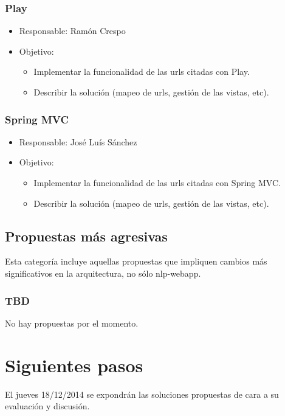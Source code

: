 \documentclass[11pt]{article}
\begin{document}
\subsubsection{Play}
\label{sec-3-2-1}
\begin{itemize}
\item Responsable: Ramón Crespo
\item Objetivo:
\begin{itemize}
\item Implementar la funcionalidad de las urls citadas con Play.
\item Describir la solución (mapeo de urls, gestión de las vistas, etc).
\end{itemize}
\end{itemize}
\subsubsection{Spring MVC}
\label{sec-3-2-2}
\begin{itemize}
\item Responsable: José Luís Sánchez
\item Objetivo:
\begin{itemize}
\item Implementar la funcionalidad de las urls citadas con Spring MVC.
\item Describir la solución (mapeo de urls, gestión de las vistas, etc).
\end{itemize}
\end{itemize}
\subsection{Propuestas más agresivas}
\label{sec-3-3}
Esta categoría incluye aquellas propuestas que impliquen cambios más significativos en la arquitectura, no sólo nlp-webapp.
\subsubsection{TBD}
\label{sec-3-3-1}
No hay propuestas por el momento.
\section{Siguientes pasos}
\label{sec-4}
El jueves 18/12/2014 se expondrán las soluciones propuestas de cara a su evaluación y discusión.
\end{document}
